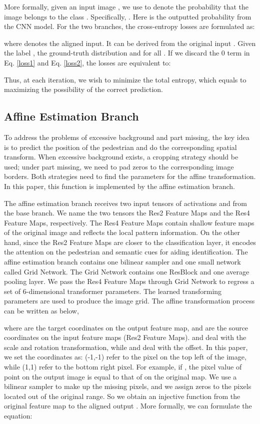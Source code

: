 More formally, given an input image , we use   to denote the probability that the image  belongs to the class . Specifically, . Here  is the outputted probability from the CNN model. For the two branches,  the cross-entropy losses are formulated as:


where  denotes the aligned input. It can be derived from the original input . Given the label , the ground-truth distribution  and  for all . If we discard the 0 term in Eq. \ref{loss1} and Eq. \ref{loss2}, the losses are equivalent to: 


Thus, at each iteration, we wish to minimize the total entropy, which equals to maximizing the possibility of the correct prediction. 

\subsection{Affine Estimation Branch} \label{stn} 
To address the problems of excessive background and part missing, the key idea is to predict the position of the pedestrian and do the corresponding spatial transform. When excessive background exists, a cropping strategy should be used; under part missing, we need to pad zeros to the corresponding image borders. Both strategies need to find the parameters for the affine transformation. In this paper, this function is implemented by the affine estimation branch.


The affine estimation branch receives two input tensors of activations  and  from the base branch. We name the two tensors the Res2 Feature Maps and the Res4 Feature Maps, respectively. The Res4 Feature Maps contain shallow feature maps of the original image and reflects the local pattern information. On the other hand, since the Res2 Feature Maps are closer to the  classification layer, it encodes the attention on the pedestrian and semantic cues for aiding identification. The affine estimation branch contains one bilinear sampler and one small network called Grid Network. The Grid Network contains one ResBlock and one average pooling layer. We pass the Res4 Feature Maps through Grid Network to regress a set of 6-dimensional transformer parameters. The learned transforming parameters  are used to produce the image grid. The affine transformation process can be written as below,

where   are the target coordinates on the output feature map, and   are the source coordinates on the input feature maps (Res2 Feature Maps).  and  deal with the scale and rotation transformation, while
 and  deal with the offset. In this paper, we set the coordinates as: (-1,-1) refer to the pixel on the top left of the image, while (1,1) refer to the bottom right pixel. For example, if , the pixel value of point  on the output image is equal to that of  on the original map. 
We use a bilinear sampler to make up the missing pixels, and we assign zeros to the pixels located out of the original range.
So we obtain an injective function from the original feature map  to the aligned output . More formally, we can formulate the equation: 

